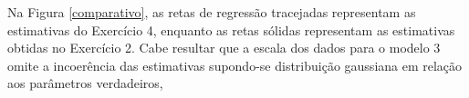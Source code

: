\documentclass{homework}\usepackage[]{graphicx}\usepackage[]{color}
\newenvironment{knitrout}{}{} %
\begin{document}
\begin{enumerate}
\begin{knitrout}
\end{knitrout}

Na Figura \ref{comparativo}, as retas de regressão tracejadas representam as estimativas do Exercício 4, enquanto as retas sólidas representam as estimativas obtidas no Exercício 2. Cabe resultar que a escala dos dados para o modelo 3 omite a incoerência das estimativas supondo-se distribuição gaussiana em relação aos parâmetros verdadeiros,

\end{enumerate}




\end{document}
